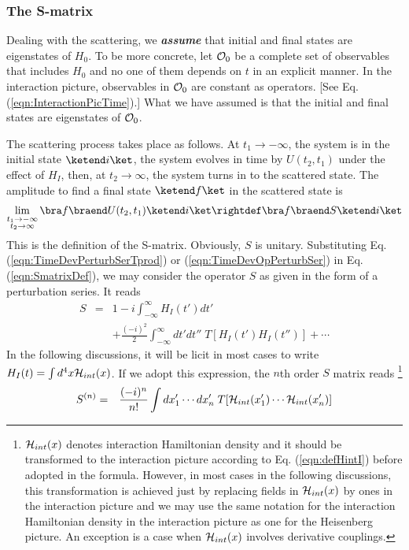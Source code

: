 \subsubsection{The S-matrix}
Dealing with the scattering, we {\bf \textit{assume}} that initial and final states are
eigenstates of $H_0$. To be more concrete, let ${\cal O}_0$ be a complete set of
observables that includes $H_0$ and no one of them depends on $t$ in an explicit manner.
In the interaction picture, observables in ${\cal O}_0$ are constant as operators. [See Eq.
(\ref{eqn:InteractionPicTime}).] What we have assumed is that the initial and final states
are eigenstates of ${\cal O}_0$.

The scattering process takes place as follows. At $t_1 \to -\infty$, the system is in the initial
state $\ketend i \ket$, the system evolves in time by $U(t_2, t_1)$ under the effect of
$H_I$, then, at $t_2 \to \infty$, the system turns in to the scattered state.
The amplitude to find a final state $\ketend f \ket$ in the scattered state is 
\begin{eqnarray}
\lim_{\stackrel{\scriptstyle t_1 \to -\infty}{t_2 \to \infty}}
\bra f \braend U(t_2, t_1) \ketend i \ket
\rightdef
\bra f \braend S \ketend i \ket
\label{eqn:SmatrixDef}
\end{eqnarray}
This is the definition of the S-matrix. Obviously, $S$ is unitary.
Substituting Eq. (\ref{eqn:TimeDevPerturbSerTprod}) or (\ref{eqn:TimeDevOpPerturbSer}) 
in Eq. (\ref{eqn:SmatrixDef}), we 
may consider the operator $S$ as given in the form of a perturbation series.
It reads
\begin{eqnarray}
 S 
&=&
1 
 -i \int_{-\infty}^\infty H_I (t') dt'
\nonumber\\
&&+
\frac{(-i)^2}{2}
\int_{-\infty}^\infty dt'
 dt''
\;T[ H_I (t') H_I (t'')]
+ \cdots
\label{eqn:SmatrixPertSer}
\end{eqnarray}
In the following discussions, it will be licit in most cases
to write $H_I(t) = \int d^4x {\cal H}_{int}(x)$.
If we adopt this expression, the $n$th order $S$ matrix reads
\footnote{
${\cal H}_{int}(x)$ denotes interaction Hamiltonian density
and it should be transformed to the interaction picture according to 
Eq. (\ref{eqn:defHintI}) before adopted in the formula.
However, in most cases in the following discussions,
this transformation is achieved just by replacing fields in
${\cal H}_{int}(x)$ by ones in the interaction picture
and we may use the same notation for the interaction Hamiltonian
density in the interaction picture as one for the Heisenberg picture.
An exception is a case when ${\cal H}_{int}(x)$ involves
derivative couplings.
}
\begin{eqnarray}
 S^{(n)} 
&=&
\frac{(-i)^n}{n!}
\int dx_1' \cdots dx_n'
\;T[ 
{\cal H}_{int}(x_1') \cdots {\cal H}_{int}(x_n')
]
\label{eqn:nthorderSmatrix}
\end{eqnarray}

